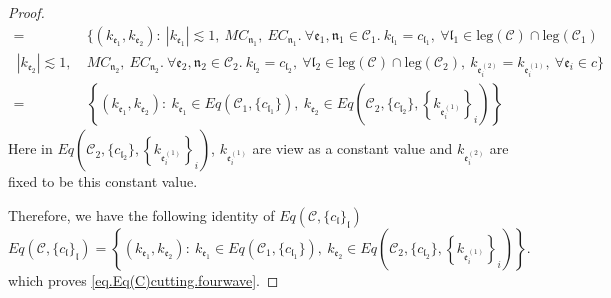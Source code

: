 \begin{proof}
\begin{equation}
\begin{split}
 =&\{(k_{\mathfrak{e}_1},k_{\mathfrak{e}_2}):\ |k_{\mathfrak{e}_1}| \lesssim 1,\ MC_{\mathfrak{n}_1},\  EC_{\mathfrak{n}_1}.\ \forall \mathfrak{e}_1, \mathfrak{n}_1\in\mathcal{C}_1.\ k_{\mathfrak{l}_1}=c_{\mathfrak{l}_1},\ \forall \mathfrak{l}_1\in \text{leg}(\mathcal{C})\cap \text{leg}(\mathcal{C}_1)
 \\
 \ |k_{\mathfrak{e}_2}| \lesssim 1,\ &MC_{\mathfrak{n}_2},\  EC_{\mathfrak{n}_2}.\ \forall \mathfrak{e}_2, \mathfrak{n}_2\in\mathcal{C}_2.\ k_{\mathfrak{l}_2}=c_{\mathfrak{l}_2},\ \forall \mathfrak{l}_2\in \text{leg}(\mathcal{C})\cap \text{leg}(\mathcal{C}_2),\ k_{\mathfrak{e}_{i}^{(2)}}=k_{\mathfrak{e}_{i}^{(1)}},\ \forall\mathfrak{e}_{i}\in c\}
 \\
 =&\left\{(k_{\mathfrak{e}_1},k_{\mathfrak{e}_{2}}):\ k_{\mathfrak{e}_1}\in Eq(\mathcal{C}_1,\{c_{\mathfrak{l}_1}\}),\  k_{\mathfrak{e}_{2}}\in Eq\left(\mathcal{C}_{2}, \{c_{\mathfrak{l}_2}\}, \left\{k_{\mathfrak{e}_{i}^{(1)}}\right\}_{i}\right)\right\}
 \end{split}
\end{equation}
Here in $Eq\left(\mathcal{C}_{2}, \{c_{\mathfrak{l}_2}\}, \left\{k_{\mathfrak{e}_{i}^{(1)}}\right\}_{i}\right)$, $k_{\mathfrak{e}_{i}^{(1)}}$ are view as a constant value and $k_{\mathfrak{e}_{i}^{(2)}}$ are fixed to be this constant value.

Therefore, we have the following identity of $Eq(\mathcal{C},\{c_{\mathfrak{l}}\}_{\mathfrak{l}})$
\begin{equation}
 Eq(\mathcal{C},\{c_{\mathfrak{l}}\}_{\mathfrak{l}})=\left\{(k_{\mathfrak{e}_1},k_{\mathfrak{e}_{2}}):\ k_{\mathfrak{e}_1}\in Eq(\mathcal{C}_1,\{c_{\mathfrak{l}_1}\}),\  k_{\mathfrak{e}_{2}}\in Eq\left(\mathcal{C}_{2}, \{c_{\mathfrak{l}_2}\}, \left\{k_{\mathfrak{e}_{i}^{(1)}}\right\}_{i}\right)\right\}.
\end{equation}
which proves \eqref{eq.Eq(C)cutting.fourwave}.


\end{proof}
